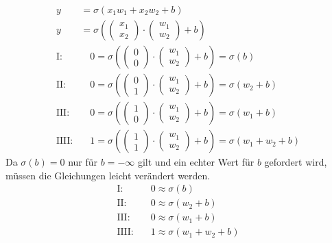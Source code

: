 \documentclass[a4paper]{report}
\begin{document}
\begin{align}
    y&=\sigma(x_1w_1+x_2w_2+b) \\
    y&=\sigma\left(\begin{pmatrix}
        x_1 \\
        x_2
    \end{pmatrix}\cdot
    \begin{pmatrix}
        w_1 \\
        w_2
    \end{pmatrix}+b\right) \\
    \text{I:}&\quad 0=\sigma\left(\begin{pmatrix}
        0 \\
        0
    \end{pmatrix}\cdot
    \begin{pmatrix}
        w_1 \\
        w_2
    \end{pmatrix}+b\right)=\sigma(b) \\
    \text{II:}&\quad 0=\sigma\left(\begin{pmatrix}
        0 \\
        1
    \end{pmatrix}\cdot
    \begin{pmatrix}
        w_1 \\
        w_2
    \end{pmatrix}+b\right)=\sigma(w_2+b) \\
    \text{III:}&\quad 0=\sigma\left(\begin{pmatrix}
        1 \\
        0
    \end{pmatrix}\cdot
    \begin{pmatrix}
        w_1 \\
        w_2
    \end{pmatrix}+b\right)=\sigma(w_1+b) \\
    \text{IIII:}&\quad 1=\sigma\left(\begin{pmatrix}
        1 \\
        1
    \end{pmatrix}\cdot
    \begin{pmatrix}
        w_1 \\
        w_2
    \end{pmatrix}+b\right)=\sigma(w_1+w_2+b)
\end{align}
Da $\sigma(b)=0$ nur für $b=-\infty$ gilt und ein echter Wert für $b$ gefordert wird, müssen die Gleichungen leicht verändert werden.
\begin{align}
    \text{I:}&\quad 0\approx\sigma(b) \\
    \text{II:}&\quad 0\approx\sigma(w_2+b) \\
    \text{III:}&\quad 0\approx\sigma(w_1+b) \\
    \text{IIII:}&\quad 1\approx\sigma(w_1+w_2+b)
\end{align}
\end{document}

